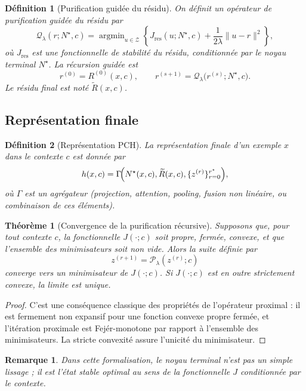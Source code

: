 \documentclass[11pt,a4paper]{article}
\newtheorem{definition}{Définition}[section]
\newtheorem{theorem}{Théorème}[section]
\newtheorem{remark}{Remarque}[section]
\DeclareMathOperator{\argmin}{argmin}
\newcommand{\Z}{\mathcal Z}
\newcommand{\Pcal}{\mathcal P}
\newcommand{\Qcal}{\mathcal Q}
\newcommand{\1}{\mathbf 1}
\begin{document}
\begin{definition}[Purification guidée du résidu]
On définit un opérateur de purification guidée du résidu par
\[
\Qcal_\lambda(r;N^\star,c)
=
\argmin_{u\in\Z}
\left\{
J_{\mathrm{res}}(u;N^\star,c)
+
\frac{1}{2\lambda}\|u-r\|^2
\right\},
\]
où \(J_{\mathrm{res}}\) est une fonctionnelle de stabilité du résidu, conditionnée par le noyau terminal \(N^\star\).
La récursion guidée est
\[
r^{(0)} = R^{(0)}(x,c),
\qquad
r^{(s+1)} = \Qcal_\lambda\!\bigl(r^{(s)};N^\star,c\bigr).
\]
Le résidu final est noté \(\widetilde R(x,c)\).
\end{definition}

\subsection{Représentation finale}

\begin{definition}[Représentation PCH]
La représentation finale d'un exemple \(x\) dans le contexte \(c\) est donnée par
\[
h(x,c)
=
\Gamma\!\Bigl(
N^\star(x,c),
\widetilde R(x,c),
\{z^{(r)}\}_{r=0}^{r^\star}
\Bigr),
\]
où \(\Gamma\) est un agrégateur (projection, attention, pooling, fusion non linéaire, ou combinaison de ces éléments).
\end{definition}

\begin{theorem}[Convergence de la purification récursive]
Supposons que, pour tout contexte \(c\), la fonctionnelle \(J(\cdot;c)\) soit propre, fermée, convexe, et que l'ensemble des minimisateurs soit non vide. Alors la suite définie par
\[
z^{(r+1)}=\Pcal_\lambda(z^{(r)};c)
\]
converge vers un minimisateur de \(J(\cdot;c)\). Si \(J(\cdot;c)\) est en outre strictement convexe, la limite est unique.
\end{theorem}

\begin{proof}
C'est une conséquence classique des propriétés de l'opérateur proximal : il est fermement non expansif pour une fonction convexe propre fermée, et l'itération proximale est Fejér-monotone par rapport à l'ensemble des minimisateurs. La stricte convexité assure l'unicité du minimisateur.
\end{proof}

\begin{remark}
Dans cette formalisation, le noyau terminal n'est pas un simple lissage ; il est l'état stable optimal au sens de la fonctionnelle \(J\) conditionnée par le contexte.
\end{remark}
\end{document}
